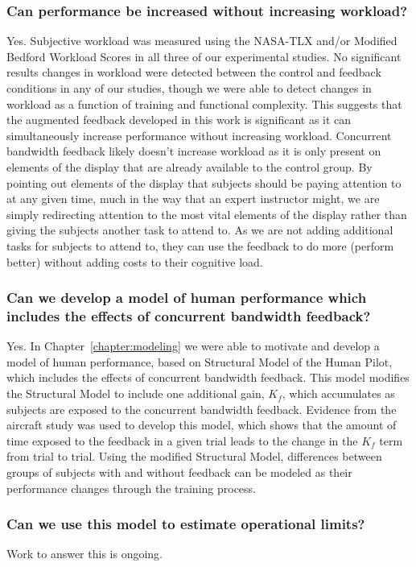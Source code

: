 \subsubsection{Can performance be increased without increasing workload?}
Yes.
Subjective workload was measured using the NASA-TLX and/or Modified Bedford Workload Scores in all three of our experimental studies.
No significant results changes in workload were detected between the control and feedback conditions in any of our studies, though we were able to detect changes in workload as a function of training and functional complexity.
This suggests that the augmented feedback developed in this work is significant as it can simultaneously increase performance without increasing workload.
Concurrent bandwidth feedback likely doesn't increase workload as it is only present on elements of the display that are already available to the control group.
By pointing out elements of the display that subjects should be paying attention to at any given time, much in the way that an expert instructor might, we are simply redirecting attention to the most vital elements of the display rather than giving the subjects another task to attend to.
As we are not adding additional tasks for subjects to attend to, they can use the feedback to do more (perform better) without adding costs to their cognitive load.

\subsubsection{Can we develop a model of human performance which includes the effects of concurrent bandwidth feedback?}
Yes.
In Chapter~\ref{chapter:modeling} we were able to motivate and develop a model of human performance, based on Structural Model of the Human Pilot, which includes the effects of concurrent bandwidth feedback.
This model modifies the Structural Model to include one additional gain, $K_f$, which accumulates as subjects are exposed to the concurrent bandwidth feedback.
Evidence from the aircraft study was used to develop this model, which shows that the amount of time exposed to the feedback in a given trial leads to the change in the $K_f$ term from trial to trial.
Using the modified Structural Model, differences between groups of subjects with and without feedback can be modeled as their performance changes through the training process.

\subsubsection{Can we use this model to estimate operational limits?}
Work to answer this is ongoing.

